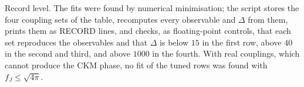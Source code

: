 Record level. The fits were found by numerical minimisation; the script stores the four coupling sets of the table, recomputes every observable and $\Delta$ from them, prints them as RECORD lines, and checks, as floating-point controls, that each set reproduces the observables and that $\Delta$ is below $15$ in the first row, above $40$ in the second and third, and above $1000$ in the fourth. With real couplings, which cannot produce the CKM phase, no fit of the tuned rows was found with $f_{J} \le \sqrt{4\pi}$.

